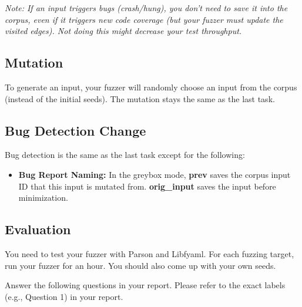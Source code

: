 \documentclass[letterpaper,11pt]{article}
\begin{document}

\textit{Note: If an input triggers bugs (crash/hung), you don't need to save it into the corpus, even if it triggers new code coverage (but your fuzzer must update the visited edges). Not doing this might decrease your test throughput.}



\subsection{Mutation}

To generate an input, your fuzzer will randomly choose an input from the corpus (instead of the initial seeds).
The mutation stays the same as the last task.

\subsection{Bug Detection Change}

Bug detection is the same as the last task except for the following:

\begin{itemize}
    \item \textbf{Bug Report Naming:} In the greybox mode, \textbf{prev} saves the corpus input ID that this input is mutated from. \textbf{orig_input} saves the input before minimization.
\end{itemize}


\subsection{Evaluation}

You need to test your fuzzer with Parson and Libfyaml.
For each fuzzing target, run your fuzzer for an hour.
You should also come up with your own seeds.

Answer the following questions in your report. Please refer to the exact labels (e.g., Question 1) in your report.
\end{document}
